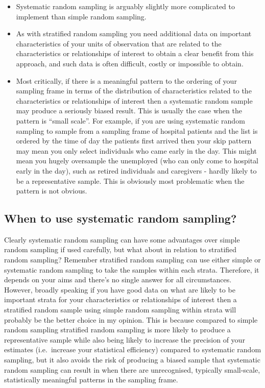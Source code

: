 \documentclass[
]{book}
\begin{document}
\begin{itemize}
\item
  Systematic random sampling is arguably slightly more complicated to implement than simple random sampling.
\item
  As with stratified random sampling you need additional data on important characteristics of your units of observation that are related to the characteristics or relationships of interest to obtain a clear benefit from this approach, and such data is often difficult, costly or impossible to obtain.
\item
  Most critically, if there is a meaningful pattern to the ordering of your sampling frame in terms of the distribution of characteristics related to the characteristics or relationships of interest then a systematic random sample may produce a seriously biased result. This is usually the case when the pattern is ``small scale''. For example, if you are using systematic random sampling to sample from a sampling frame of hospital patients and the list is ordered by the time of day the patients first arrived then your skip pattern may mean you only select individuals who came early in the day. This might mean you hugely oversample the unemployed (who can only come to hospital early in the day), such as retired individuals and caregivers - hardly likely to be a representative sample. This is obviously most problematic when the pattern is not obvious.
\end{itemize}

\hypertarget{when-to-use-systematic-random-sampling}{%
\subsection{When to use systematic random sampling?}\label{when-to-use-systematic-random-sampling}}

Clearly systematic random sampling can have some advantages over simple random sampling if used carefully, but what about in relation to stratified random sampling? Remember stratified random sampling can use either simple or systematic random sampling to take the samples within each strata. Therefore, it depends on your aims and there's no single answer for all circumstances. However, broadly speaking if you have good data on what are likely to be important strata for your characteristics or relationships of interest then a stratified random sample using simple random sampling within strata will probably be the better choice in my opinion. This is because compared to simple random sampling stratified random sampling is more likely to produce a representative sample while also being likely to increase the precision of your estimates (i.e.~increase your statistical efficiency) compared to systematic random sampling, but it also avoids the risk of producing a biased sample that systematic random sampling can result in when there are unrecognised, typically small-scale, statistically meaningful patterns in the sampling frame.
\end{document}
